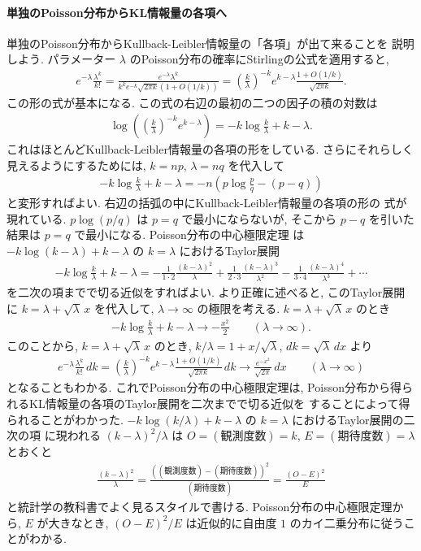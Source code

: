 \documentclass[12pt,twoside]{jarticle}
\theoremstyle{jplain}
\theoremstyle{jplain}
\theoremstyle{jplain}
\numberwithin{theorem}{section}
\numberwithin{equation}{section}
\numberwithin{figure}{section}
\numberwithin{table}{section}
\begin{document}
\paragraph{単独のPoisson分布からKL情報量の各項へ}
単独のPoisson分布からKullback-Leibler情報量の「各項」が出て来ることを
説明しよう. パラメーター $\lambda$ のPoisson分布の確率にStirlingの公式を適用すると,
\begin{align*}
e^{-\lambda}\frac{\lambda^k}{k!}
=\frac{e^{-\lambda}\lambda^k}{k^k e^{-k}\sqrt{2\pi k}(1+O(1/k))}
=\left(\frac{k}{\lambda}\right)^{-k}e^{k-\lambda}\frac{1+O(1/k)}{\sqrt{2\pi k}}.
\end{align*}
この形の式が基本になる. この式の右辺の最初の二つの因子の積の対数は
\begin{align*}
\log\left(\left(\frac{k}{\lambda}\right)^{-k}e^{k-\lambda}\right)
=-k\log\frac{k}{\lambda}+k-\lambda.
\end{align*}
これはほとんどKullback-Leibler情報量の各項の形をしている.
さらにそれらしく見えるようにするためには, $k=np$, $\lambda=nq$ を代入して
\begin{align*}
-k\log\frac{k}{\lambda}+k-\lambda
=-n\left(p\log\frac{p}{q}-(p-q)\right)
\end{align*}
と変形すればよい. 右辺の括弧の中にKullback-Leibler情報量の各項の形の
式が現れている.
$p\log(p/q)$ は $p=q$ で最小にならないが,
そこから $p-q$ を引いた結果は $p=q$ で最小になる.
Poisson分布の中心極限定理
は $-k\log(k-\lambda)+k-\lambda$ の $k=\lambda$ におけるTaylor展開
\begin{align*}
-k\log\frac{k}{\lambda}+k-\lambda
=-\frac{1}{1\cdot2}\frac{(k-\lambda)^2}{\lambda}
+\frac{1}{2\cdot3}\frac{(k-\lambda)^3}{\lambda^2}
-\frac{1}{3\cdot4}\frac{(k-\lambda)^4}{\lambda^3}
+\cdots
\end{align*}
を二次の項までで切る近似をすればよい.
より正確に述べると,
このTaylor展開に $k=\lambda+\sqrt\lambda\,x$ を代入して,
$\lambda\to\infty$ の極限を考える. $k=\lambda+\sqrt\lambda\,x$ のとき
\begin{align*}
-k\log\frac{k}{\lambda}+k-\lambda \longrightarrow -\frac{x^2}{2}
\qquad (\lambda\to\infty).
\end{align*}
このことから, $k=\lambda+\sqrt\lambda\,x$ のとき,
$k/\lambda=1+x/\sqrt{\lambda}$, $dk=\sqrt{\lambda}\,dx$ より
\begin{align*}
e^{-\lambda}\frac{\lambda^k}{k!}\,dk
=\left(\frac{k}{\lambda}\right)^{-k}e^{k-\lambda}\frac{1+O(1/k)}{\sqrt{2\pi k}}\,dk
\longrightarrow
\frac{e^{-x^2}}{\sqrt{2\pi}}\,dx
\qquad (\lambda\to\infty)
\end{align*}
となることもわかる. これでPoisson分布の中心極限定理は,
Poisson分布から得られるKL情報量の各項のTaylor展開を二次までで切る近似を
することによって得られることがわかった.
$-k\log(k/\lambda)+k-\lambda$ の $k=\lambda$ におけるTaylor展開の二次の項
に現われる $(k-\lambda)^2/\lambda$ は $O=(\text{観測度数})=k$,
$E=(\text{期待度数})=\lambda$ とおくと
\begin{align*}
\frac{(k-\lambda)^2}{\lambda}
=\frac{((\text{観測度数})-(\text{期待度数}))^2}{(\text{期待度数})}
=\frac{(O-E)^2}{E}
\end{align*}
と統計学の教科書でよく見るスタイルで書ける.
Poisson分布の中心極限定理から, $E$ が大きなとき,
$(O-E)^2/E$ は近似的に自由度 $1$ のカイ二乗分布に従うことがわかる.
\end{document}
